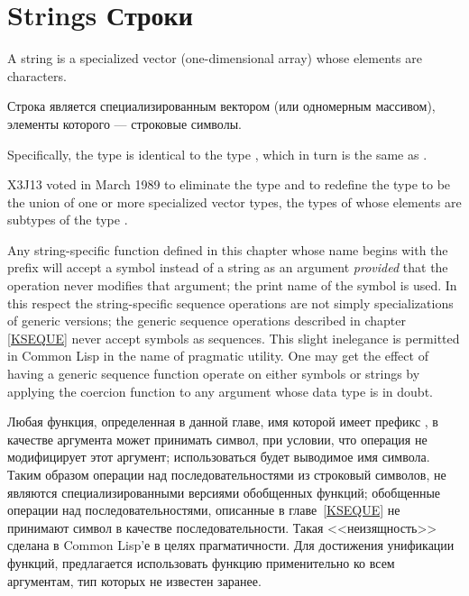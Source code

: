 

\chapter{Strings Строки}
\def\pagestatus{FINAL PROOF}

A string is a specialized vector (one-dimensional array)
whose elements are characters.

Строка является специализированным вектором (или одномерным массивом), элементы
которого --- строковые символы.

\begin{obsolete}
Specifically, the type 
is identical to the type , which in turn
is the same as .
\end{obsolete}

\begin{newer}
X3J13 voted in March 1989 
to eliminate the type  and to redefine the type
 to be the union of one or more specialized vector
types, the types of whose elements are subtypes of the type .
\end{newer}

Any string-specific function defined in this chapter
whose name begins with the prefix 
will accept a symbol instead of a string
as an argument \emph{provided} that the operation never modifies that argument;
the print name of the symbol is used.
In this respect the string-specific sequence operations are not
simply specializations of generic versions; the generic sequence
operations described in chapter \ref{KSEQUE} never accept symbols as sequences.
This slight inelegance is permitted in Common Lisp in the name of pragmatic utility.
One may get the effect of having a generic sequence function
operate on either symbols or strings by applying the coercion
function  to any argument whose data type is in doubt.

Любая функция, определенная в данной главе, имя которой имеет префикс
, в качестве аргумента может принимать символ, при
условии, что операция не модифицирует этот аргумент;
использоваться будет выводимое имя символа.
Таким образом операции над последовательностями из строковый символов, не
являются специализированными версиями обобщенных функций; обобщенные операции
над последовательностями, описанные в главе~\ref{KSEQUE} не принимают символ в
качестве последовательности. Такая <<неизящность>> сделана в Common Lisp'е в
целях прагматичности. Для достижения унификации функций, предлагается использовать
функцию  применительно ко всем аргументам, тип которых не известен заранее.

